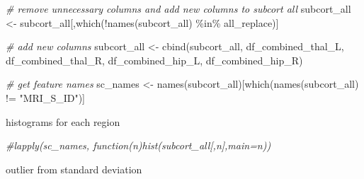 \documentclass[
]{article}
\newenvironment{Shaded}{\begin{snugshade}}{\end{snugshade}}
\newcommand{\CommentTok}[1]{\textcolor[rgb]{0.56,0.35,0.01}{\textit{#1}}}
\newcommand{\FunctionTok}[1]{\textcolor[rgb]{0.00,0.00,0.00}{#1}}
\newcommand{\NormalTok}[1]{#1}
\newcommand{\OtherTok}[1]{\textcolor[rgb]{0.56,0.35,0.01}{#1}}
\newcommand{\SpecialCharTok}[1]{\textcolor[rgb]{0.00,0.00,0.00}{#1}}
\newcommand{\StringTok}[1]{\textcolor[rgb]{0.31,0.60,0.02}{#1}}
\begin{document}
\begin{Shaded}
\begin{Highlighting}[]
\CommentTok{\# remove unnecessary columns and add new columns to subcort all}
\NormalTok{subcort\_all }\OtherTok{\textless{}{-}}\NormalTok{ subcort\_all[,}\FunctionTok{which}\NormalTok{(}\SpecialCharTok{!}\FunctionTok{names}\NormalTok{(subcort\_all) }\SpecialCharTok{\%in\%}\NormalTok{ all\_replace)]}

\CommentTok{\# add new columns}
\NormalTok{subcort\_all }\OtherTok{\textless{}{-}} \FunctionTok{cbind}\NormalTok{(subcort\_all, df\_combined\_thal\_L, df\_combined\_thal\_R, df\_combined\_hip\_L, df\_combined\_hip\_R)}

\CommentTok{\# get feature names}
\NormalTok{sc\_names }\OtherTok{\textless{}{-}} \FunctionTok{names}\NormalTok{(subcort\_all)[}\FunctionTok{which}\NormalTok{(}\FunctionTok{names}\NormalTok{(subcort\_all) }\SpecialCharTok{!=} \StringTok{"MRI\_S\_ID"}\NormalTok{)]}
\end{Highlighting}
\end{Shaded}

histograms for each region

\begin{Shaded}
\begin{Highlighting}[]
\CommentTok{\#lapply(sc\_names, function(n)hist(subcort\_all[,n],main=n))}
\end{Highlighting}
\end{Shaded}

outlier from standard deviation
\end{document}
